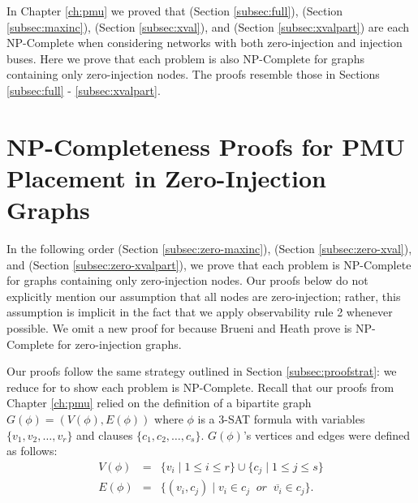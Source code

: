 
In Chapter \ref{ch:pmu} we proved that \full (Section \ref{subsec:full}), \maxinc (Section \ref{subsec:maxinc}), \xval (Section \ref{subsec:xval}),
and \xvalpart (Section \ref{subsec:xvalpart}) are each NP-Complete when considering networks with both zero-injection and injection buses.  Here we prove that each problem is also NP-Complete
for graphs containing only zero-injection nodes.  The proofs resemble those in Sections \ref{subsec:full} - \ref{subsec:xvalpart}. %


\section{NP-Completeness Proofs for PMU Placement in Zero-Injection Graphs}

In the following order \maxinc (Section \ref{subsec:zero-maxinc}), \xval (Section \ref{subsec:zero-xval}), and \xvalpart (Section \ref{subsec:zero-xvalpart}), 
we prove that each problem is NP-Complete for graphs containing only zero-injection nodes.  Our proofs below do not explicitly mention our assumption that all nodes 
are zero-injection; rather, %
this assumption is implicit in the fact that we apply observability rule 2 whenever possible.
We omit a new proof for \full because Brueni and Heath \cite{Brueni05} prove \full is NP-Complete for zero-injection graphs.  

Our proofs follow the same strategy outlined in Section \ref{subsec:proofstrat}: we reduce for \sat to show each problem is NP-Complete.  
Recall that our proofs from Chapter \ref{ch:pmu} relied on the definition of a bipartite 
graph $G(\phi)=(V(\phi),E(\phi))$ where $\phi$ is a 3-SAT formula with variables $\{v_1,v_2, \dots , v_r\}$ and clauses $\{c_1,c_2, \dots , c_s \}$.  
$G(\phi)$'s vertices and edges were defined as follows:
\begin{eqnarray*}
 V(\phi) &= &\{v_i\; \vert\; 1 \leq i \leq r \} \cup \{c_j \;\vert\; 1 \leq j \leq s \} \\
 E(\phi) &=& \{ (v_i,c_j)\;\vert\; v_i \in c_j\;\; or \;\; \overline{v_i} \in c_j\}.
\end{eqnarray*}


